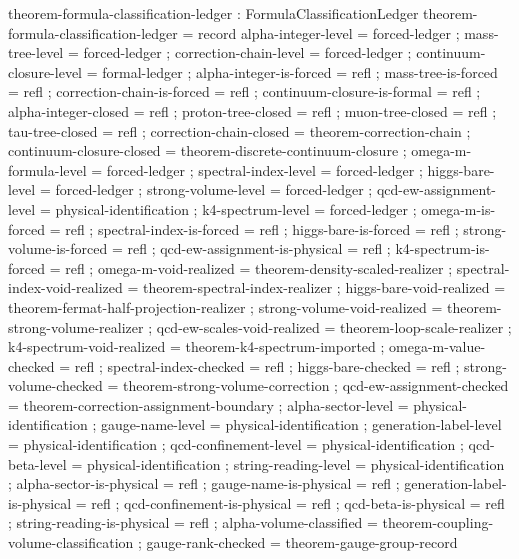 \documentclass[11pt,a4paper]{book}
\begin{document}
\begin{code}
theorem-formula-classification-ledger : FormulaClassificationLedger
theorem-formula-classification-ledger = record
  { alpha-integer-level        = forced-ledger
  ; mass-tree-level            = forced-ledger
  ; correction-chain-level     = forced-ledger
  ; continuum-closure-level    = formal-ledger
  ; alpha-integer-is-forced    = refl
  ; mass-tree-is-forced        = refl
  ; correction-chain-is-forced = refl
  ; continuum-closure-is-formal = refl
  ; alpha-integer-closed       = refl
  ; proton-tree-closed         = refl
  ; muon-tree-closed           = refl
  ; tau-tree-closed            = refl
  ; correction-chain-closed    = theorem-correction-chain
  ; continuum-closure-closed   = theorem-discrete-continuum-closure
  ; omega-m-formula-level      = forced-ledger
  ; spectral-index-level       = forced-ledger
  ; higgs-bare-level           = forced-ledger
  ; strong-volume-level        = forced-ledger
  ; qcd-ew-assignment-level    = physical-identification
  ; k4-spectrum-level          = forced-ledger
  ; omega-m-is-forced          = refl
  ; spectral-index-is-forced   = refl
  ; higgs-bare-is-forced       = refl
  ; strong-volume-is-forced    = refl
  ; qcd-ew-assignment-is-physical = refl
  ; k4-spectrum-is-forced      = refl
  ; omega-m-void-realized      = theorem-density-scaled-realizer
  ; spectral-index-void-realized = theorem-spectral-index-realizer
  ; higgs-bare-void-realized   = theorem-fermat-half-projection-realizer
  ; strong-volume-void-realized = theorem-strong-volume-realizer
  ; qcd-ew-scales-void-realized = theorem-loop-scale-realizer
  ; k4-spectrum-void-realized  = theorem-k4-spectrum-imported
  ; omega-m-value-checked      = refl
  ; spectral-index-checked     = refl
  ; higgs-bare-checked         = refl
  ; strong-volume-checked      = theorem-strong-volume-correction
  ; qcd-ew-assignment-checked  = theorem-correction-assignment-boundary
  ; alpha-sector-level         = physical-identification
  ; gauge-name-level           = physical-identification
  ; generation-label-level     = physical-identification
  ; qcd-confinement-level      = physical-identification
  ; qcd-beta-level             = physical-identification
  ; string-reading-level       = physical-identification
  ; alpha-sector-is-physical   = refl
  ; gauge-name-is-physical     = refl
  ; generation-label-is-physical = refl
  ; qcd-confinement-is-physical = refl
  ; qcd-beta-is-physical       = refl
  ; string-reading-is-physical = refl
  ; alpha-volume-classified    = theorem-coupling-volume-classification
  ; gauge-rank-checked         = theorem-gauge-group-record
}
\end{code}
\end{document}
